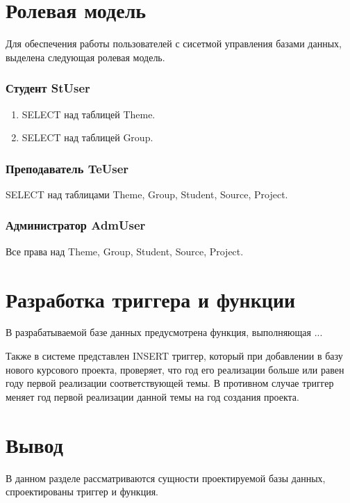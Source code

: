\section{Ролевая модель}

Для обеспечения работы пользователей с сисетмой управления базами данных, выделена
следующая ролевая модель.

\subsubsection*{Студент StUser}

\begin{enumerate}
	\item SELECT над таблицей Theme.
	\item SELECT над таблицей Group.
\end{enumerate}


\subsubsection*{Преподаватель TeUser}

	SELECT над таблицами Theme, Group, Student, Source, Project.



\subsubsection*{Администратор AdmUser}

	Все права над Theme, Group, Student, Source, Project.


\section{Разработка триггера и функции}

В разрабатываемой базе данных предусмотрена функция, выполняющая ...

Также в системе представлен INSERT триггер, который при добавлении в базу нового курсового проекта, проверяет, что год его реализации больше или равен году первой реализации соответствующей темы. В противном случае триггер меняет год первой реализации данной темы на год создания проекта.


\section{Вывод}
В данном разделе рассматриваются сущности проектируемой базы данных, спроектированы триггер и функция.